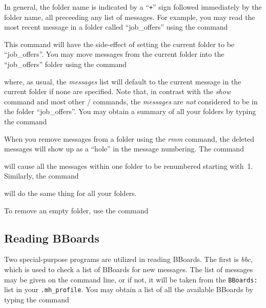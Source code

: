 
In general, the folder name is indicated by a ``{\tt+}'' sign followed
immediately by the folder name, all preceeding any list of messages. For
example, you may read the most recent message in a folder called
``job\_offers'' using the command


This command will have the side-effect of setting the current folder to be
``job\_offers''. You may move messages from the current folder into the
``job\_offers'' folder using the command


where, as usual, the {\it messages\/} list will default to the current
message in the current folder if none are specified.  Note that, in contrast
with the {\it show\/} command and most other \MH/ commands, the {\it
messages\/} are {\em not\/} considered to be in the folder ``job\_offers''.
You may obtain a summary of all your folders by typing the command


When you remove messages from a folder using the {\it rmm\/} command,
the deleted messages will show up as a ``hole'' in the message numbering.
The command


will cause all the messages within one folder to be renumbered starting
with~1. Similarly, the command


will do the same thing for all your folders.

To remove an empty folder, use the command


\subsection{Reading BBoards}\label{BBoards}

Two special-purpose programs are utilized in reading BBoards.  The first is
{\it bbc,} which is used to check a list of BBoards for new messages.
The list of messages may be given on the command line, or if not, it will be
taken from the {\tt BBoards:} list in your \verb|.mh_profile|.  You may
obtain a list of all the available BBoards by typing the command


